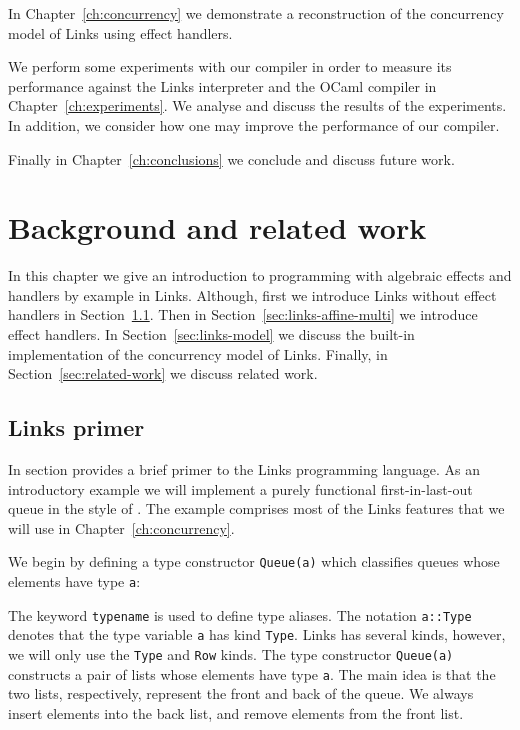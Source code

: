 \documentclass[12pt,mscres,cdtppar,twoside,openright,logo,rightchapter,normalheadings]{infthesis}
\newcommand{\snippet}[1]{}
\theoremstyle{definition}
\begin{document}
In Chapter~\ref{ch:concurrency} we demonstrate a reconstruction of the
concurrency model of Links using effect handlers.

We perform some experiments with our compiler in order to measure its
performance against the Links interpreter and the OCaml compiler in
Chapter~\ref{ch:experiments}. We analyse and discuss the results of
the experiments. In addition, we consider how one may improve the
performance of our compiler.

Finally in Chapter~\ref{ch:conclusions} we conclude and discuss future
work.


\chapter{Background and related work}
\label{ch:background}
In this chapter we give an introduction to programming with algebraic
effects and handlers by example in Links. Although, first we introduce
Links without effect handlers in Section~\ref{sec:links-primer}. Then
in Section~\ref{sec:links-affine-multi} we introduce effect
handlers. In Section~\ref{sec:links-model} we discuss the built-in
implementation of the concurrency model of Links. Finally, in
Section~\ref{sec:related-work} we discuss related work.

\section{Links primer}
\label{sec:links-primer}
In section provides a brief primer to the Links programming
language. As an introductory example we will implement a purely
functional first-in-last-out queue in the style of
\cite{Okasaki1998}. The example comprises most of the Links features
that we will use in Chapter~\ref{ch:concurrency}.

We begin by defining a type constructor \lstinline$Queue(a)$ which
classifies queues whose elements have type \lstinline$a$:
%
\snippet{queue.links}
%
The keyword \lstinline$typename$ is used to define type aliases. The
notation \lstinline$a::Type$ denotes that the type variable
\lstinline$a$ has kind \lstinline$Type$. Links has several kinds,
however, we will only use the \lstinline$Type$ and \lstinline$Row$
kinds. The type constructor \lstinline$Queue(a)$ constructs a pair of
lists whose elements have type \lstinline$a$. The main idea is that
the two lists, respectively, represent the front and back of the
queue. We always insert elements into the back list, and remove
elements from the front list.
\end{document}
